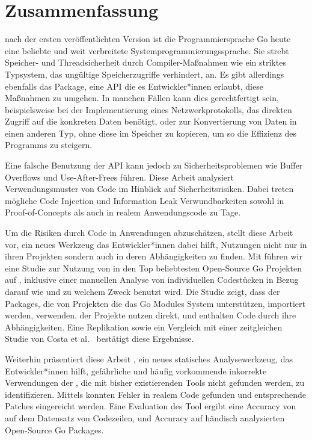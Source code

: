 \chapter*{Zusammenfassung}

 nach der ersten veröffentlichten Version ist die Programmiersprache Go heute eine beliebte und
weit verbreitete Systemprogrammierungssprache.
Sie strebt Speicher- und Threadsicherheit durch Compiler-Maßnahmen wie ein striktes Typsystem, das
ungültige Speicherzugriffe verhindert, an.
Es gibt allerdings ebenfalls das \unsafe{} Package, eine API die es Entwickler*innen erlaubt, diese
Maßnahmen zu umgehen.
In manchen Fällen kann dies gerechtfertigt sein, beispielsweise bei der Implementierung eines
Netzwerkprotokolls, das direkten Zugriff auf die konkreten Daten benötigt, oder zur Konvertierung von Daten in einen
anderen Typ, ohne diese im Speicher zu kopieren, um so die Effizienz des Programms zu steigern.

Eine falsche Benutzung der \unsafe{} API kann jedoch zu Sicherheitsproblemen wie Buffer Overflows und Use-After-Frees
führen.
Diese Arbeit analysiert Verwendungsmuster von \unsafe{} Code im Hinblick auf Sicherheitsrisiken.
Dabei treten mögliche Code Injection und Information Leak Verwundbarkeiten sowohl in Proof-of-Concepts als auch in
realem Anwendungscode zu Tage.

Um die Risiken durch \unsafe{} Code in Anwendungen abzuschätzen, stellt diese Arbeit \toolGeiger{} vor, ein neues
Werkzeug das Entwickler*innen dabei hilft, \unsafe{} Nutzungen nicht nur in ihren Projekten sondern auch in deren
Abhängigkeiten zu finden.
Mit \toolGeiger{} führen wir eine Studie zur Nutzung von \unsafe{} in den Top \projsTotal{} beliebtesten Open-Source Go
Projekten auf \github{}, inklusive einer manuellen Analyse von \numberLabeledCodeSnippets{} individuellen Codestücken
in Bezug darauf wie und zu welchem Zweck \unsafe{} benutzt wird.
Die Studie zeigt, dass \percentageUnsafePackages{} der Packages, die von Projekten die das Go Modules System
unterstützen, importiert werden, \unsafe{} verwenden.
\percentageUnsafeProjects{} der Projekte nutzen \unsafe{} direkt, und \percentageUnsafeTransitiveWithDependencies{}
enthalten \unsafe{} Code durch ihre Abhängigkeiten.
Eine Replikation sowie ein Vergleich mit einer zeitgleichen Studie von Costa et al.~\cite{costa2020} bestätigt diese
Ergebnisse.

Weiterhin präsentiert diese Arbeit \toolSafer{}, ein neues statisches Analysewerkzeug, das Entwickler*innen hilft,
 gefährliche und häufig vorkommende inkorrekte Verwendungen der \unsafe{}, die mit bisher existierenden
Tools nicht gefunden werden, zu identifizieren.
Mittels \toolSafer{} konnten \numberBugsFixed{} Fehler in realem Code gefunden und entsprechende Patches eingereicht
werden.
Eine Evaluation des Tool ergibt eine Accuracy von \goSaferEvaluationDatasetGosaferAccuracy{} auf dem Datensatz von
\unsafe{} Codezeilen, und \goSaferEvaluationPackagesGosaferAccuracy{} Accuracy auf händisch analysierten Open-Source
Go Packages.
